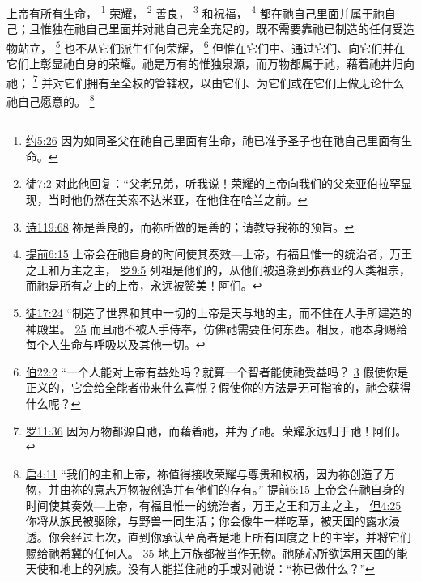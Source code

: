\documentclass[12pt, a4paper, oneside]{ctexart}
\newcounter{parnum}[section]
\newcommand{\N}{%
   \noindent\refstepcounter{parnum}%
    \makebox[\parindent][l]{\textbf{\arabic{parnum}.}}}
\begin{document}
\N 上帝有所有生命，
	\footnote {
		\href{https://biblehub.com/john/5-26.htm}{约5:26} 因为如同圣父在祂自己里面有生命，祂已准予圣子也在祂自己里面有生命。
	}
	荣耀，
	\footnote {
		\href{https://biblehub.com/acts/7-2.htm}{徒7:2} 对此他回复：“父老兄弟，听我说！荣耀的上帝向我们的父亲亚伯拉罕显现，当时他仍然在美索不达米亚，在他住在哈兰之前。
	}
	善良，
	\footnote {
		\href{https://biblehub.com/psalms/119-68.htm}{诗119:68} 祢是善良的，而祢所做的是善的；请教导我祢的预旨。
	}
	和祝福，
	\footnote {
		\href{https://biblehub.com/1_timothy/6-15.htm}{提前6:15} 上帝会在祂自身的时间使其奏效---上帝，有福且惟一的统治者，万王之王和万主之主，
		\href{https://biblehub.com/romans/9-5.htm}{罗9:5} 列祖是他们的，从他们被追溯到弥赛亚的人类祖宗，而祂是所有之上的上帝，永远被赞美！阿们。
	}
	都在祂自己里面并属于祂自己；且惟独在祂自己里面并对祂自己完全充足的，既不需要靠祂已制造的任何受造物站立，
	\footnote {
		\href{https://biblehub.com/acts/17-24.htm}{徒17:24} “制造了世界和其中一切的上帝是天与地的主，而不住在人手所建造的神殿里。
		\href{https://biblehub.com/acts/17-25.htm}{25} 而且祂不被人手侍奉，仿佛祂需要任何东西。相反，祂本身赐给每个人生命与呼吸以及其他一切。
	}
	也不从它们派生任何荣耀，
	\footnote {
		\href{https://biblehub.com/job/22-2.htm}{伯22:2} “一个人能对上帝有益处吗？就算一个智者能使祂受益吗？
		\href{https://biblehub.com/job/22-3.htm}{3} 假使你是正义的，它会给全能者带来什么喜悦？假使你的方法是无可指摘的，祂会获得什么呢？
	}
	但惟在它们中、通过它们、向它们并在它们上彰显祂自身的荣耀。祂是万有的惟独泉源，而万物都属于祂，藉着祂并归向祂；
	\footnote {
		\href{https://biblehub.com/romans/11-36.htm}{罗11:36} 因为万物都源自祂，而藉着祂，并为了祂。荣耀永远归于祂！阿们。
	}
	并对它们拥有至全权的管辖权，以由它们、为它们或在它们上做无论什么祂自己愿意的。
	\footnote {
		\href{https://biblehub.com/revelation/4-11.htm}{启4:11} “我们的主和上帝，祢值得接收荣耀与尊贵和权柄，因为祢创造了万物，并由祢的意志万物被创造并有他们的存有。”
		\href{https://biblehub.com/1_timothy/6-15.htm}{提前6:15} 上帝会在祂自身的时间使其奏效---上帝，有福且惟一的统治者，万王之王和万主之主，
		\href{https://biblehub.com/daniel/4-25.htm}{但4:25} 你将从族民被驱除，与野兽一同生活；你会像牛一样吃草，被天国的露水浸透。你会经过七次，直到你承认至高者是地上所有国度之上的主宰，并将它们赐给祂希冀的任何人。
		\href{https://biblehub.com/daniel/4-35.htm}{35} 地上万族都被当作无物。祂随心所欲运用天国的能天使和地上的列族。没有人能拦住祂的手或对祂说：“祢已做什么？”
	}
\end{document}
